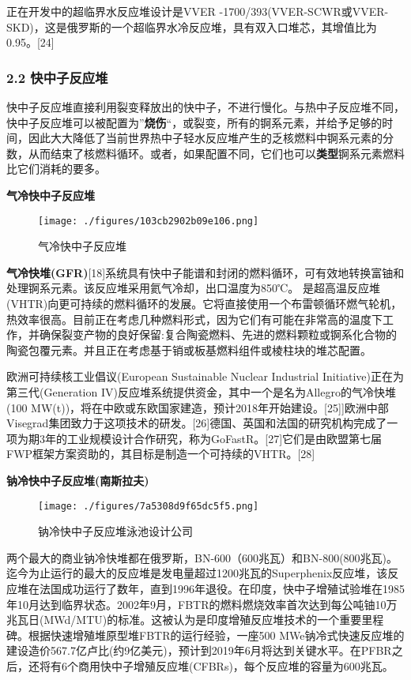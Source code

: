 正在开发中的超临界水反应堆设计是VVER -1700/393(VVER-SCWR或VVER-SKD)，这是俄罗斯的一个超临界水冷反应堆，具有双入口堆芯，其增值比为0.95。[24]

\subsubsection{2.2 快中子反应堆}
快中子反应堆直接利用裂变释放出的快中子，不进行慢化。与热中子反应堆不同，快中子反应堆可以被配置为”\textbf{烧伤}“，或裂变，所有的锕系元素，并给予足够的时间，因此大大降低了当前世界热中子轻水反应堆产生的乏核燃料中锕系元素的分数，从而结束了核燃料循环。或者，如果配置不同，它们也可以\textbf{类型}锕系元素燃料比它们消耗的要多。

\textbf{气冷快中子反应堆}

\begin{figure}[ht]
\centering
\texttt{[image: ./figures/103cb2902b09e106.png]}
\caption{气冷快中子反应堆} \label{fig_FYD_4}
\end{figure}

\textbf{气冷快堆(GFR)}[18]系统具有快中子能谱和封闭的燃料循环，可有效地转换富铀和处理锕系元素。该反应堆采用氦气冷却，出口温度为850℃。 是超高温反应堆(VHTR)向更可持续的燃料循环的发展。它将直接使用一个布雷顿循环燃气轮机，热效率很高。目前正在考虑几种燃料形式，因为它们有可能在非常高的温度下工作，并确保裂变产物的良好保留:复合陶瓷燃料、先进的燃料颗粒或锕系化合物的陶瓷包覆元素。并且正在考虑基于销或板基燃料组件或棱柱块的堆芯配置。

欧洲可持续核工业倡议(European Sustainable Nuclear Industrial Initiative)正在为第三代(Generation IV)反应堆系统提供资金，其中一个是名为Allegro的气冷快堆(100 MW(t))，将在中欧或东欧国家建造，预计2018年开始建设。[25]]欧洲中部Visegrad集团致力于这项技术的研发。[26]德国、英国和法国的研究机构完成了一项为期3年的工业规模设计合作研究，称为GoFastR。[27]它们是由欧盟第七届FWP框架方案资助的，其目标是制造一个可持续的VHTR。[28]

\textbf{钠冷快中子反应堆(南斯拉夫)}

\begin{figure}[ht]
\centering
\texttt{[image: ./figures/7a5308d9f65dc5f5.png]}
\caption{钠冷快中子反应堆泳池设计公司} \label{fig_FYD_7}
\end{figure}

两个最大的商业钠冷快堆都在俄罗斯，BN-600（600兆瓦）和BN-800(800兆瓦)。迄今为止运行的最大的反应堆是发电量超过1200兆瓦的Superphenix反应堆，该反应堆在法国成功运行了数年，直到1996年退役。在印度，快中子增殖试验堆在1985年10月达到临界状态。2002年9月，FBTR的燃料燃烧效率首次达到每公吨铀10万兆瓦日(MWd/MTU)的标准。这被认为是印度增殖反应堆技术的一个重要里程碑。根据快速增殖堆原型堆FBTR的运行经验，一座500 MWe钠冷式快速反应堆的建设造价567.7亿卢比(约9亿美元)，预计到2019年6月将达到关键水平。在PFBR之后，还将有6个商用快中子增殖反应堆(CFBRs)，每个反应堆的容量为600兆瓦。

